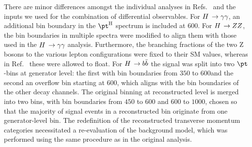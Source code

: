 There are minor differences amongst the individual analyses in Refs.~\cite{CMS_AN_2017-299,CMS_AN_2016-442,CMS_AN_2016-366} and the inputs we used for the combination of differential observables.
% 
For $H\,\to\gamma\gamma$, an additional bin boundary in the $\pth$ spectrum is included at $600$\GeV.
% 
For $H\,\to ZZ$, the bin boundaries in multiple spectra were modified to align them with those used in the $H\,\to\gamma\gamma$ analysis.
% 
% 
Furthermore, the branching fractions of the two Z bosons to the various lepton configurations were fixed to their SM values, whereas in Ref.~\cite{CMS_AN_2016-442} these were allowed to float.
% 
% 
For $H\,\to b\bar{b}$ the signal was split into two $\pt$-bins at generator level: the first with bin boundaries from $350$ to $600$\GeV and the second an overflow bin starting at $600$\GeV, which aligns with the bin boundaries of the other decay channels.
% 
The original binning at reconstructed level is merged into two bins, with bin boundaries from $450$ to $600$ and $600$ to $1000$\GeV, chosen so that the majority of signal events in a reconstructed bin originate from one generator-level bin.
% 
The redefinition of the reconstructed transverse momentum categories necessitated a re-evaluation of the background model, which was performed using the same procedure as in the original analysis.




